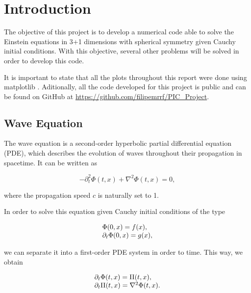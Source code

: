 \section{Introduction}
\label{sec:intro}

The objective of this project is to develop a numerical code able to solve the Einstein equations in 3+1 dimensions with spherical symmetry given Cauchy initial conditions. With this objective, several other problems will be solved in order to develop this code.

It is important to state that all the plots throughout this report were done using matplotlib \cite{Matplotlib}. Aditionally, all the code developed for this project is public and can be found on GitHub at \url{https://github.com/filipemrrf/PIC_Project}.

\subsection{Wave Equation}
The wave equation is a second-order hyperbolic partial differential equation (PDE), which describes the evolution of waves throughout their propagation in spacetime. It can be written as

\begin{equation}
    -\partial^2_t \Phi(t,x) + \nabla^2 \Phi(t,x) = 0,
    \label{eq:simple_wave}
\end{equation}

\noindent
where the propagation speed $c$ is naturally set to 1.

In order to solve this equation given Cauchy initial conditions of the type 

\begin{align}
    \begin{array}{@{}l@{}}
        \Phi(0,x)=f(x),
        \\
        \partial_t \Phi(0,x) = g(x),
    \end{array}
    \label{eq:Cauchy_boundary}
\end{align}

\noindent
we can separate it into a first-order PDE system in order to time. This way, we obtain 

\begin{align}
    \begin{array}{@{}l@{}} 
        \partial_t \Phi(t,x) = \Pi (t,x),
        \\
        \partial_t \Pi(t,x) = \nabla^2 \Phi(t,x).
    \end{array}
    \label{eq:simple_wave_system}
\end{align}

